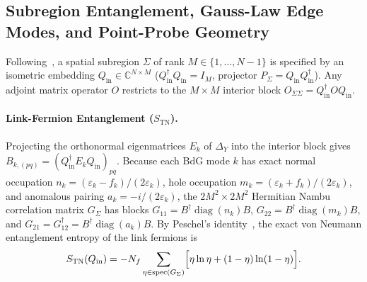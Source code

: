 \documentclass[11pt,a4paper]{article}
\DeclareMathOperator{\spec}{spec}
\begin{document}
\subsection{Subregion Entanglement, Gauss-Law Edge Modes, and Point-Probe Geometry}
Following~\cite{Fliss2025}, a spatial subregion $\Sigma$ of rank $M \in \{1,\dots,N-1\}$ is specified by an isometric embedding $Q_{\mathrm{in}} \in \mathbb{C}^{N\times M}$ ($Q_{\mathrm{in}}^\dagger Q_{\mathrm{in}} = I_M$, projector $P_\Sigma = Q_{\mathrm{in}} Q_{\mathrm{in}}^\dagger$). Any adjoint matrix operator $O$ restricts to the $M\times M$ interior block $O_{\Sigma\Sigma} = Q_{\mathrm{in}}^\dagger O Q_{\mathrm{in}}$.

\paragraph{Link-Fermion Entanglement ($S_{\mathrm{TN}}$).}
Projecting the orthonormal eigenmatrices $E_k$ of $\Delta_Y$ into the interior block gives $B_{k,(pq)} = (Q_{\mathrm{in}}^\dagger E_k Q_{\mathrm{in}})_{pq}$. Because each BdG mode $k$ has exact normal occupation $n_k = (\varepsilon_k - f_k)/(2\varepsilon_k)$, hole occupation $m_k = (\varepsilon_k + f_k)/(2\varepsilon_k)$, and anomalous pairing $a_k = -i/(2\varepsilon_k)$, the $2M^2\times 2M^2$ Hermitian Nambu correlation matrix $G_\Sigma$ has blocks $G_{11} = B^\dagger \operatorname{diag}(n_k) B$, $G_{22} = B^\dagger \operatorname{diag}(m_k) B$, and $G_{21} = G_{12}^\dagger = B^\dagger \operatorname{diag}(a_k) B$. By Peschel's identity~\cite{Peschel2003}, the exact von Neumann entanglement entropy of the link fermions is
\begin{equation}
  S_{\mathrm{TN}}(Q_{\mathrm{in}}) = -N_f \sum_{\eta \in \spec(G_\Sigma)} \Bigl[\eta \ln\eta + (1-\eta)\ln(1-\eta)\Bigr].
  \label{eq:Stn}
\end{equation}
\end{document}
